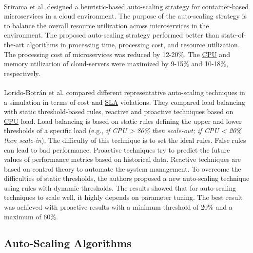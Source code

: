 \paragraph{}
Srirama et al. \cite{Srirama2020AppDeplyCont} designed a heuristic-based auto-scaling strategy for container-based microservices in a cloud environment. The purpose of the auto-scaling strategy is to balance the overall resource utilization across microservices in the environment.
The proposed auto-scaling strategy performed better than state-of-the-art algorithms in processing time, processing cost, and resource utilization. The processing cost of microservices was reduced by 12-20\%. The \hyperlink{abbr:cpu}{CPU} and memory utilization of cloud-servers were maximized by 9-15\% and 10-18\%, respectively.


\paragraph{}
Lorido-Botrán et al.  \cite{Botran2013AutoScalingComp} compared different representative auto-scaling techniques in a simulation in terms of cost and \hyperlink{abbr:sla}{SLA} violations. They compared load balancing with static threshold-based rules, reactive and proactive techniques based on \hyperlink{abbr:cpu}{CPU} load.
Load balancing is based on static rules defining the upper and lower thresholds of a specific load (e.g., \textit{if CPU > 80\% then scale-out; if CPU < 20\% then scale-in}). The difficulty of this technique is to set the ideal rules. False rules can lead to bad performance. Proactive techniques try to predict the future values of performance metrics based on historical data. Reactive techniques are based on control theory to automate the system management. To overcome the difficulties of static thresholds, the authors proposed a new auto-scaling technique using rules with dynamic thresholds. The results showed that for auto-scaling techniques to scale well, it highly depends on parameter tuning. The best result was achieved with proactive results with a minimum threshold of 20\% and a maximum of 60\%.


\subsection{Auto-Scaling Algorithms}
